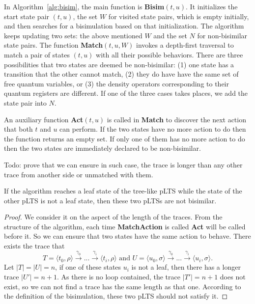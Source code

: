 \documentclass[a4paper,UKenglish,cleveref, autoref]{lipics-v2019}
\begin{document}
In Algorithm~\ref{alg:bisim}, the main function is \textbf{Bisim}$(t,u)$. It initializes the start state pair $(t,u)$, the set $W$ for visited state pairs,  which is empty initially, and then searches for a bisimulation based on that initialization. 
The algorithm keeps updating two sets: the above mentioned $W$  and the set $N$ for non-bisimilar state pairs. The function \textbf{Match}$(t,u,W)$ invokes a depth-first traversal to match a pair of 
states $(t,u)$ with all their possible behaviors. There are three possibilities that two states are deemed be non-bisimilar:  (1) one state has a transition that the other cannot match, (2) they do have have the same set of free quantum variables, or (3) the density operators corresponding to their quantum registers are different. If one of the three cases takes places, we add the state pair into $N$. 

An auxiliary function \textbf{Act}$(t,u)$ is called in \textbf{Match} to discover the next action that both $t$ and $u$ can perform. If the two states have no more action to do then the function returns an empty set. If only one of them has no more action to do then the two states are immediately declared to be non-bisimilar. 
\begin{lemma}
	Todo: prove that we can ensure in such case, the trace is  longer than any other trace from another side or unmatched with them.
\end{lemma}
\begin{theorem}
	If the algorithm reaches a leaf state of the tree-like pLTS while the state of the other pLTS is not a leaf state, then these two pLTSs are not bisimilar.
\end{theorem}
\begin{proof}
	We consider it on the aspect of the length of the traces. From the structure of the algorithm, each time \textbf{MatchAction} is called \textbf{Act} will be called before it. So we can ensure that two states have the same action to behave. There exists the trace that
	\[T = \langle t_0,\rho\rangle\xrightarrow{\gamma_0}...\xrightarrow{\gamma_i}\langle t_i,\rho\rangle\text{ and }U = \langle u_0,\sigma\rangle\xrightarrow{\gamma_0}...\xrightarrow{\gamma_i}\langle u_i,\sigma\rangle.\]
	Let $|T|=|U|=n$, if one of these states $u_i$ is not a leaf, then there has a longer trace $|U'|=n+1$. As there is no loop contained, the trace $|T'|=n+1$ does not exist, so we can not find a trace has the same length as that one. According to the definition of the bisimulation, these two pLTS should not satisfy it.
\end{proof}
\end{document}
